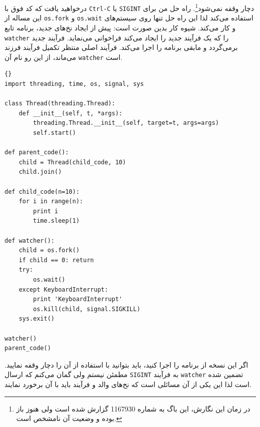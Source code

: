 \documentclass{book}
\begin{document}
    درخواهید یافت که کد فوق با {\tt Ctrl-C} یا {\tt SIGINT} دچار وقفه نمی‌شود\footnote{
    در زمان این نگارش، این باگ به شماره 1167930 گزارش شده است ولی هنوز باز بوده و وضعیت آن نامشخص است.  
    }.
    راه حل من برای این مساله از {\tt os.fork} و {\tt os.wait} استفاده می‌کند لذا این راه حل تنها روی سیستم‌های  و  
    کار می‌کند. شیوه کار بدین صورت است:‌ پیش از ایجاد نخ‌های جدید، برنامه  تابع  {\tt watcher} را که یک فرآیند جدید را ایجاد می‌کند فراخوانی می‌نماید. 
    فرآیند جدید برمی‌گردد و  مابقی برنامه را اجرا می‌کند. 
    فرآیند اصلی منتظر تکمیل فرآیند فرزند می‌ماند، از این رو نام آن   {\tt watcher} است. 
    

\begin{latin}
\begin{lstlisting}[title={The watcher}]{}
import threading, time, os, signal, sys

class Thread(threading.Thread):
    def __init__(self, t, *args):
        threading.Thread.__init__(self, target=t, args=args)
        self.start()

def parent_code():
    child = Thread(child_code, 10)
    child.join()

def child_code(n=10):
    for i in range(n):
        print i
        time.sleep(1)

def watcher():
    child = os.fork()
    if child == 0: return
    try:
        os.wait()
    except KeyboardInterrupt:
        print 'KeyboardInterrupt'
        os.kill(child, signal.SIGKILL)
    sys.exit()

watcher()
parent_code()
\end{lstlisting}
\end{latin}


    اگر این نسخه از برنامه را اجرا کنید،‌ باید بتوانید با استفاده از  آن را دچار وقفه نمایید. 
    مطمئن نیستم ولی گمان می‌کنم که  ارسال {\tt SIGINT} به فرآیند {\tt watcher} تضمین شده است لذا 
    این یکی از آن مسائلی است که نخ‌های والد و فرآیند باید با آن برخورد نمایند. 
\end{document}
